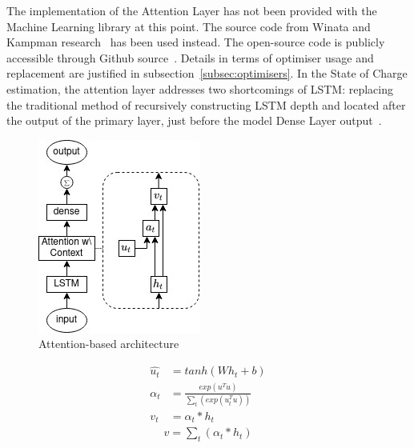 %
The implementation of the Attention Layer has not been provided with the Machine Learning library at this point.
The source code from Winata and Kampman research~\cite{winata_attention-based_2018} has been used instead.
The open-source code is publicly accessible through Github source~\cite{attention_8461990}.
Details in terms of optimiser usage and replacement are justified in subsection~\ref{subsec:optimisers}.
In the State of Charge estimation, the attention layer addresses two shortcomings of LSTM: replacing the traditional method of recursively constructing LSTM depth and located after the output of the primary layer, just before the model Dense Layer output~\cite{mamo_long_2020}.
\begin{figure}[htbp]
    \centering
    \includegraphics[width=0.35\linewidth]{II_Body/LSTM/images/AttenrionDrawing.jpg}
    \caption{Attention-based architecture}
    \label{fig:attention}
\end{figure}
\begin{equation}
    \begin{split}
        \hat{u_t} &= tanh \left(W h_{t} + b \right) \\
             \alpha_t &= \frac{exp(u^T u)}{\sum_t(exp(u_t^T u))} \\
              v_t &= \alpha_t*h_t%
    \end{split}
    \label{eq:AttentionWithContext}
\end{equation}
\begin{equation}
    \begin{split}
        v = \sum_t(\alpha_t * h_t)
    \end{split}
    \label{eq:Addition}
\end{equation}
%
